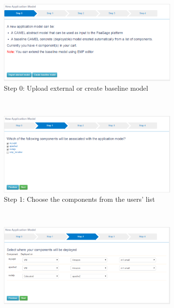 \begin{figure}
\begin{subfigure}{.8\textwidth}
  \centering
  \includegraphics[scale=0.4]{./fig/model_creation0.png}
  \caption{Step 0: Upload external or create baseline model}
  \label{fig:sfig0}
\end{subfigure} \\[1ex]
\begin{subfigure}{.8\textwidth}
  \centering
  \includegraphics[scale=0.4]{./fig/model_creation1.png}
  \caption{Step 1: Choose the components from the users' list}
  \label{fig:sfig1}
\end{subfigure} \\[1ex]
\begin{subfigure}{.8\textwidth}
  \centering
  \includegraphics[scale=0.4]{./fig/model_creation2.png}

\end{subfigure}
\end{figure}
